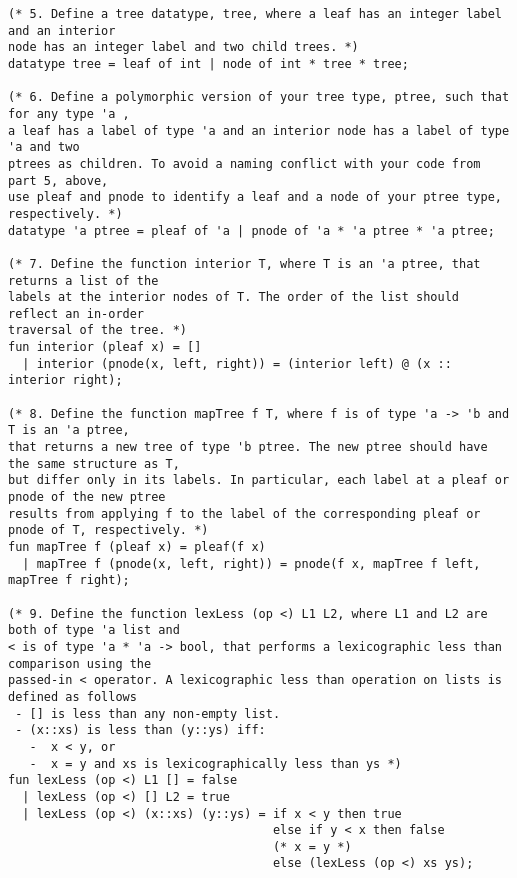 \documentclass[10pt]{article}
\begin{document}
\begin{verbatim}
(* 5. Define a tree datatype, tree, where a leaf has an integer label and an interior 
node has an integer label and two child trees. *)
datatype tree = leaf of int | node of int * tree * tree;

(* 6. Define a polymorphic version of your tree type, ptree, such that for any type 'a , 
a leaf has a label of type 'a and an interior node has a label of type 'a and two 
ptrees as children. To avoid a naming conflict with your code from part 5, above, 
use pleaf and pnode to identify a leaf and a node of your ptree type, respectively. *)
datatype 'a ptree = pleaf of 'a | pnode of 'a * 'a ptree * 'a ptree;

(* 7. Define the function interior T, where T is an 'a ptree, that returns a list of the 
labels at the interior nodes of T. The order of the list should reflect an in-order 
traversal of the tree. *)
fun interior (pleaf x) = []
  | interior (pnode(x, left, right)) = (interior left) @ (x :: interior right);
  
(* 8. Define the function mapTree f T, where f is of type 'a -> 'b and T is an 'a ptree, 
that returns a new tree of type 'b ptree. The new ptree should have the same structure as T,
but differ only in its labels. In particular, each label at a pleaf or pnode of the new ptree
results from applying f to the label of the corresponding pleaf or pnode of T, respectively. *)
fun mapTree f (pleaf x) = pleaf(f x)
  | mapTree f (pnode(x, left, right)) = pnode(f x, mapTree f left, mapTree f right);
  
(* 9. Define the function lexLess (op <) L1 L2, where L1 and L2 are both of type 'a list and
< is of type 'a * 'a -> bool, that performs a lexicographic less than comparison using the
passed-in < operator. A lexicographic less than operation on lists is defined as follows
 - [] is less than any non-empty list.
 - (x::xs) is less than (y::ys) iff:
   -  x < y, or
   -  x = y and xs is lexicographically less than ys *)
fun lexLess (op <) L1 [] = false
  | lexLess (op <) [] L2 = true
  | lexLess (op <) (x::xs) (y::ys) = if x < y then true
                                     else if y < x then false
                                     (* x = y *)
                                     else (lexLess (op <) xs ys);
                                     

\end{verbatim}
\end{document}
